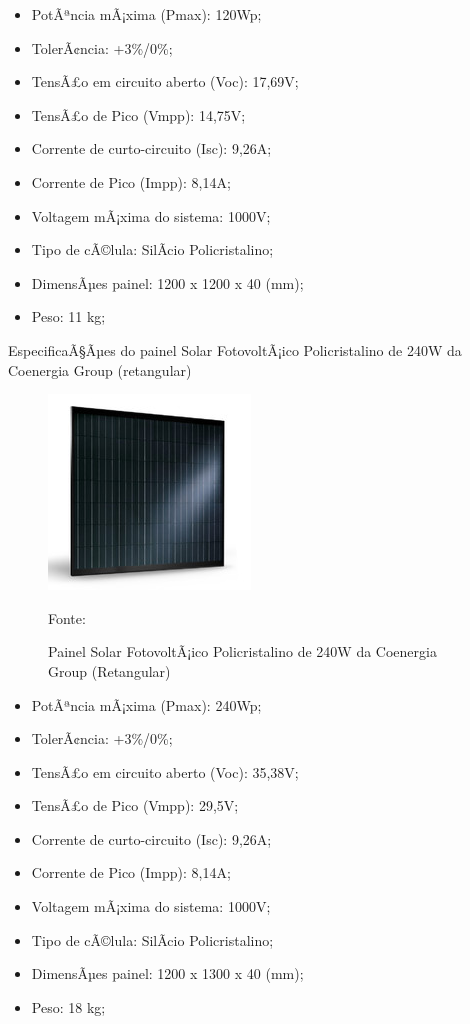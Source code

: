 \begin{itemize}
	\item PotÃªncia mÃ¡xima (Pmax): 120Wp;
	\item TolerÃ¢ncia: +3\%/0\%;
	\item TensÃ£o em circuito aberto (Voc): 17,69V;
	\item TensÃ£o de Pico (Vmpp): 14,75V;
	\item Corrente de curto-circuito (Isc): 9,26A;
	\item Corrente de Pico (Impp): 8,14A;
	\item Voltagem mÃ¡xima do sistema: 1000V;
	\item Tipo de cÃ©lula: SilÃ­cio Policristalino;
	\item DimensÃµes painel: 1200 x 1200 x 40 (mm);
	\item Peso: 11 kg;
\end{itemize}

EspecificaÃ§Ãµes do painel Solar FotovoltÃ¡ico Policristalino de 240W da Coenergia Group (retangular)

\begin{figure}[H]
	\centering
	\label{Painel Solar FotovoltÃ¡ico Policristalino de 240W da Coenergia Group (Retangular)}
		\includegraphics[keepaspectratio=true,scale=0.9]{solar/3.png}
	\caption{Painel Solar FotovoltÃ¡ico Policristalino de 240W da Coenergia Group (Retangular)}
	\small{Fonte: \cite{COENERGIA}}
\end{figure}

\begin{itemize}
	\item PotÃªncia mÃ¡xima (Pmax): 240Wp;
	\item TolerÃ¢ncia: +3\%/0\%;
	\item TensÃ£o em circuito aberto (Voc): 35,38V;
	\item TensÃ£o de Pico (Vmpp): 29,5V;
	\item Corrente de curto-circuito (Isc): 9,26A;
	\item Corrente de Pico (Impp): 8,14A;
	\item Voltagem mÃ¡xima do sistema: 1000V;
	\item Tipo de cÃ©lula: SilÃ­cio Policristalino;	
	\item DimensÃµes painel: 1200 x 1300 x 40 (mm);
	\item Peso: 18 kg;
\end{itemize}

